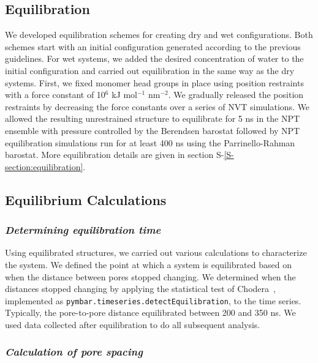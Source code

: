 \documentclass[journal=jpcbfk,manuscript=article]{achemso}
\begin{document}
  \subsection{Equilibration}\label{section:equilibration}
  We developed equilibration schemes for creating dry and wet configurations.
  Both schemes start with an initial configuration generated according to the
  previous guidelines. For wet systems, we added the desired concentration of
  water to the initial configuration and carried out equilibration in the same
  way as the dry systems. First, we fixed monomer head groups in place using
  position restraints with a force constant of 10$^6$ kJ mol$^{-1}$ nm$^{-2}$. We
  gradually released the position restraints by decreasing the force constants
  over a series of NVT simulations. We allowed the resulting unrestrained
  structure to equilibrate for 5 ns in the NPT ensemble with pressure controlled
  by the Berendsen barostat followed by NPT equilibration simulations run for at
  least 400 ns using the Parrinello-Rahman barostat. More equilibration details
  are given in section S-\ref{S-section:equilibration}.

  \subsection{Equilibrium Calculations}

  \subsubsection{\textit{Determining equilibration time}}\label{method:equil_time}

  Using equilibrated structures, we carried out various calculations to
  characterize the system. We defined the point at which a system is equilibrated
  based on when the distance between pores stopped changing.  We determined when
  the distances stopped changing by applying the statistical test of Chodera~\cite{chodera_simple_2016},
  implemented as \texttt{pymbar.timeseries.detectEquilibration}, to the time series. Typically, the pore-to-pore
  distance equilibrated between 200 and 350 ns. We used data collected after 
  equilibration to do all subsequent analysis.

  \subsubsection{\textit{Calculation of pore spacing}}\label{method:pore_spacing}
\end{document}

